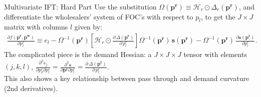 \begin{frame}{Multivariate IFT: Hard Part}
Use the substitution $\Omega(\symbf{p^r}) \equiv \mathcal{H}_r \odot \Delta_{r}(\symbf{p^r})$, and differentiate the wholesalers' system of FOC's with respect to $p_l$, to get the $J \times J$ matrix with columns $l$ given by:
\begin{align}
\frac{\partial f(\symbf{p^r},\symbf{p^w})}{\partial p_l^r} \equiv e_l - \Omega^{-1}(\symbf{p^r})
\left[  \mathcal{H}_{r} \odot \frac{\partial\, \Delta(\symbf{p^r})}{\partial\, p_l^r} \right]
\Omega^{-1}(\symbf{p^r})\,
\symbf{s}(\symbf{p^r}) -\Omega^{-1}(\symbf{p^r})\, \frac{\partial \symbf{s}(\symbf{p^r})}{\partial p_l^r}.
\end{align}
The complicated piece is the demand Hessian: a $J \times J \times J$ tensor with elements $(j,k,l)$, $\frac{\partial^2 s_j}{\partial p_k^r \partial p_l^r} = \frac{\partial^2 \symbf{s}}{\partial \symbf{p^r} \partial p_l^r}=\frac{\partial\, \Delta(\symbf{p^r})}{\partial\, p_l^r}$.\\

This also shows a key relationship between \alert{pass through} and \alert{demand curvature} (2nd derivatives).
\end{frame}



